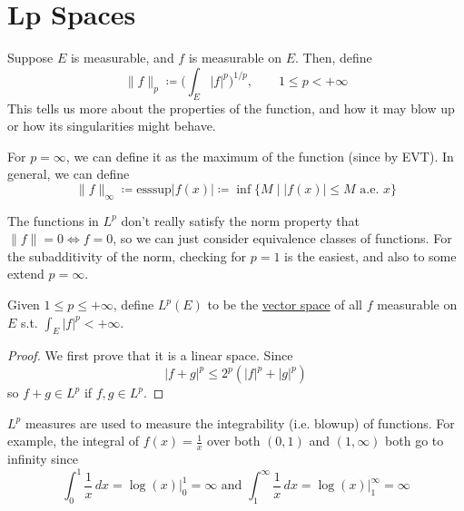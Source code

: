 \section{Lp Spaces}

  Suppose $E$ is measurable, and $f$ is measurable on $E$. Then, define 
  \begin{equation}
    \|f\|_p \coloneqq \bigg( \int_E |f|^p \bigg)^{1/p}, \qquad 1 \leq p < +\infty
  \end{equation} 
  This tells us more about the properties of the function, and how it may blow up or how its singularities might behave. 

  For $p = \infty$, we can define it as the maximum of the function (since by EVT). In general, we can define 
  \begin{equation}
    \|f\|_{\infty} \coloneqq \mathrm{esssup} |f(x)| \coloneqq \inf \{ M \mid |f(x)| \leq M \text{ a.e. } x\}
  \end{equation}

  The functions in $L^p$ don't really satisfy the norm property that $\|f\| = 0 \iff f =0$, so we can just consider equivalence classes of functions. For the subadditivity of the norm, checking for $p=1$ is the easiest, and also to some extend $p=\infty$. 

  \begin{definition}[Lp Space]
    \label{def:lp-space}
    Given $1 \leq p \leq +\infty$, define $L^p (E)$ to be the \hyperref[lin-def:vector-space]{vector space} of all $f$ measurable on $E$ s.t. $\int_E |f|^p < +\infty$. 
  \end{definition}
  \begin{proof}
    We first prove that it is a linear space. Since 
    \begin{equation}
      | f + g |^p \leq 2^p (|f|^p + |g|^p)
    \end{equation}
    so $f + g \in L^p$ if $f, g \in L^p$. 
  \end{proof}

	$L^p$ measures are used to measure the integrability (i.e. blowup) of functions. For example, the integral of $f(x) = \frac{1}{x}$ over both $(0, 1)$ and $(1, \infty)$ both go to infinity since 
	\begin{equation}
		\int_0^1 \frac{1}{x}\,dx = \log(x) \big|^1_0 = \infty \text{ and } \int_1^\infty \frac{1}{x} \, dx = \log(x) \big|_1^\infty = \infty
	\end{equation}

